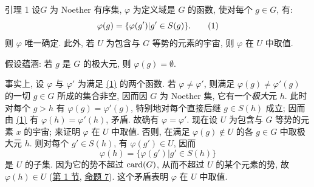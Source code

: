 \hypertarget{sga4.exp.I.appendix.II.sec.6.lemma.1}{}
\begin{enonce*}{引理 1}
设\pageoriginale $G$ 为 Noether 有序集, $\varphi$ 为定义域是 $G$ 的函数, 使对每个 $g\in G$, 有:
\hypertarget{sga4.exp.I.appendix.II.sec.6.lemma.1.equation.1}{}
\begin{equation}
\varphi(g)=\{\varphi(g')| g'\in S(g)\}{}.\tag{1}
\end{equation}
则 $\varphi$ 唯一确定. 此外, 若 $U$ 为包含与 $G$ 等势的元素的宇宙, 则 $\varphi$ 在 $U$ 中取值.
\end{enonce*}

假设蕴涵: 若 $g$ 是 $G$ 的极大元, 则 $\varphi(g)=∅$.

事实上, 设 $\varphi$ 与 $\varphi'$ 为满足 \hyperlink{sga4.exp.I.appendix.II.sec.6.lemma.1.equation.1}{(1)} 的两个函数. 若 $\varphi\neq \varphi'$, 则满足 $\varphi(g)\neq \varphi'(g)$ 的一切 $g\in G$ 所成的集合非空, 因而因 $G$ 为 Noether 集, 它有一个\emph{极大}元 $h$. 此时对每个 $g>h$ 有 $\varphi(g)=\varphi'(g)$, 特别地对每个直接后继 $g\in S(h)$ 成立; 因而由 \hyperlink{sga4.exp.I.appendix.II.sec.6.lemma.1.equation.1}{(1)} 有 $\varphi(h)=\varphi'(h)$, 矛盾. 故确有 $\varphi=\varphi'$. 现在设 $U$ 为包含与 $G$ 等势的元素 $x$ 的宇宙; 来证明 $\varphi$ 在 $U$ 中取值. 否则, 在满足 $\varphi(g)\not\in U$ 的各 $g\in G$ 中取极大元 $h$. 则对每个 $g'\in S(h)$, 有 $\varphi(g')\in U$, 因而
$$
\varphi(h)=\{\varphi(g')| g'\in S(h)\}
$$
是 $U$ 的子集. 因为它的势不超过 $\operatorname{card}(G)$, 从而不超过 $U$ 的某个元素的势, 故 $\varphi(h)\in U$ (\hyperlink{sga4.exp.I.appendix.II.sec.1}{第 1 节}, \hyperlink{sga4.exp.I.appendix.II.sec.1.proposition.7}{命题 7}). 这个矛盾表明 $\varphi$ 在 $U$ 中取值.

